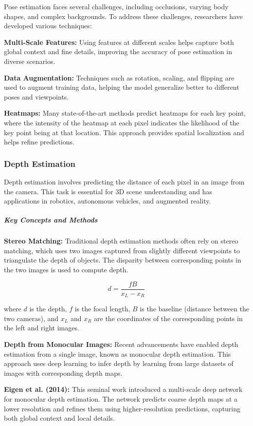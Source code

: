 \documentclass[12pt]{article}
\begin{document}
Pose estimation faces several challenges, including occlusions, varying body shapes, and complex backgrounds. To address these challenges, researchers have developed various techniques:

\textbf{Multi-Scale Features:} Using features at different scales helps capture both global context and fine details, improving the accuracy of pose estimation in diverse scenarios.

\textbf{Data Augmentation:} Techniques such as rotation, scaling, and flipping are used to augment training data, helping the model generalize better to different poses and viewpoints.

\textbf{Heatmaps:} Many state-of-the-art methods predict heatmaps for each key point, where the intensity of the heatmap at each pixel indicates the likelihood of the key point being at that location. This approach provides spatial localization and helps refine predictions.

\subsubsection{Depth Estimation}

Depth estimation involves predicting the distance of each pixel in an image from the camera. This task is essential for 3D scene understanding and has applications in robotics, autonomous vehicles, and augmented reality.

\subparagraph{Key Concepts and Methods}

\textbf{Stereo Matching:} Traditional depth estimation methods often rely on stereo matching, which uses two images captured from slightly different viewpoints to triangulate the depth of objects. The disparity between corresponding points in the two images is used to compute depth.

\[
d = \frac{fB}{x_L - x_R}
\]

where \( d \) is the depth, \( f \) is the focal length, \( B \) is the baseline (distance between the two cameras), and \( x_L \) and \( x_R \) are the coordinates of the corresponding points in the left and right images.

\textbf{Depth from Monocular Images:} Recent advancements have enabled depth estimation from a single image, known as monocular depth estimation. This approach uses deep learning to infer depth by learning from large datasets of images with corresponding depth maps.

\textbf{Eigen et al. (2014):} This seminal work introduced a multi-scale deep network for monocular depth estimation. The network predicts coarse depth maps at a lower resolution and refines them using higher-resolution predictions, capturing both global context and local details.
\end{document}
